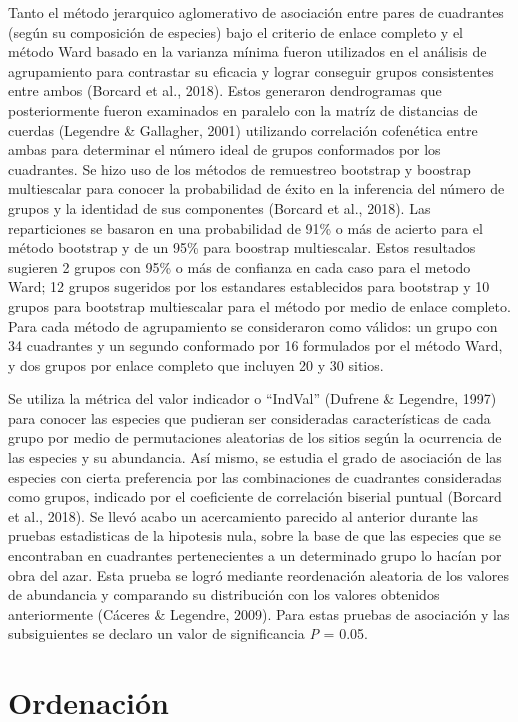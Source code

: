 \documentclass[11pt,]{article}
\begin{document}
Tanto el método jerarquico aglomerativo de asociación entre pares de
cuadrantes (según su composición de especies) bajo el criterio de enlace
completo y el método Ward basado en la varianza mínima fueron utilizados
en el análisis de agrupamiento para contrastar su eficacia y lograr
conseguir grupos consistentes entre ambos (Borcard et al., 2018). Estos
generaron dendrogramas que posteriormente fueron examinados en paralelo
con la matríz de distancias de cuerdas (Legendre \& Gallagher, 2001)
utilizando correlación cofenética entre ambas para determinar el número
ideal de grupos conformados por los cuadrantes. Se hizo uso de los
métodos de remuestreo bootstrap y boostrap multiescalar para conocer la
probabilidad de éxito en la inferencia del número de grupos y la
identidad de sus componentes (Borcard et al., 2018). Las reparticiones
se basaron en una probabilidad de 91\% o más de acierto para el método
bootstrap y de un 95\% para boostrap multiescalar. Estos resultados
sugieren 2 grupos con 95\% o más de confianza en cada caso para el
metodo Ward; 12 grupos sugeridos por los estandares establecidos para
bootstrap y 10 grupos para bootstrap multiescalar para el método por
medio de enlace completo. Para cada método de agrupamiento se
consideraron como válidos: un grupo con 34 cuadrantes y un segundo
conformado por 16 formulados por el método Ward, y dos grupos por enlace
completo que incluyen 20 y 30 sitios.

Se utiliza la métrica del valor indicador o ``IndVal'' (Dufrene \&
Legendre, 1997) para conocer las especies que pudieran ser consideradas
características de cada grupo por medio de permutaciones aleatorias de
los sitios según la ocurrencia de las especies y su abundancia. Así
mismo, se estudia el grado de asociación de las especies con cierta
preferencia por las combinaciones de cuadrantes consideradas como
grupos, indicado por el coeficiente de correlación biserial puntual
(Borcard et al., 2018). Se llevó acabo un acercamiento parecido al
anterior durante las pruebas estadisticas de la hipotesis nula, sobre la
base de que las especies que se encontraban en cuadrantes pertenecientes
a un determinado grupo lo hacían por obra del azar. Esta prueba se logró
mediante reordenación aleatoria de los valores de abundancia y
comparando su distribución con los valores obtenidos anteriormente
(Cáceres \& Legendre, 2009). Para estas pruebas de asociación y las
subsiguientes se declaro un valor de significancia \emph{P} = 0.05.

\section{Ordenación}\label{ordenaciuxf3n}
\end{document}
